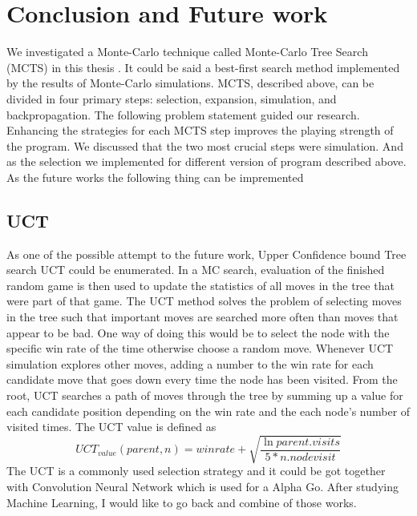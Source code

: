 \documentclass[12pt]{article}
\begin{document}
\section{Conclusion and Future work}
We investigated a Monte-Carlo technique called Monte-Carlo Tree Search (MCTS) in this thesis . It could be said a best-first search method implemented by the results of Monte-Carlo simulations. MCTS, described above, can be divided in four primary steps: selection, expansion, simulation, and backpropagation. The following problem statement guided our research.
Enhancing the strategies for each MCTS step improves the playing strength of the program. We discussed that the two most crucial steps were simulation. And as the selection we implemented for different version of program described above. As the future works the following thing can be impremented 
\subsection{UCT}
As one of the possible attempt to the future work, Upper Confidence bound Tree search UCT could be enumerated\cite{kocsis2006bandit}.  In a MC search, evaluation of the finished random game is then used to update the statistics of all moves in the tree that were part of that game. The UCT method solves the problem of selecting moves in the tree such that important moves are searched more often than moves that appear to be bad. One way of doing this would be to select the node with the specific win rate of the time otherwise choose a random move. Whenever UCT simulation explores other moves,  adding a number to the win rate for each candidate move that goes down every time the node has been visited. From the root, UCT searches a path of moves through the tree by summing up a value for each candidate position depending on the win rate and the each node’s number of visited times. The UCT value is defined as 
\[UCT_{value}(parent, n) = winrate + \sqrt{\frac{\ln{parent.visits}}{5*n.nodevisit}}\]
The UCT is a commonly used selection strategy and it could be got together with Convolution Neural Network which is used for a Alpha Go\cite{silver2016mastering}. After studying Machine Learning, I would like to go back and combine of those works. 
\end{document}
